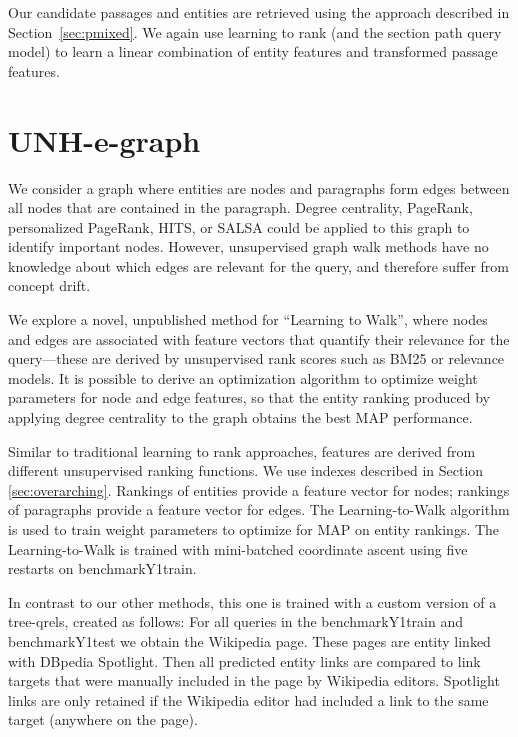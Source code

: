\documentclass{article}
\begin{document}
Our candidate passages and entities are retrieved using the approach described in Section~\ref{sec:pmixed}. We again use learning to rank (and the section path query model) to learn a linear combination of entity features and transformed passage features.



\section{UNH-e-graph}

We consider a graph where entities are nodes and paragraphs form edges between all nodes that are contained in the paragraph. Degree centrality, PageRank, personalized PageRank, HITS, or SALSA could be applied to this graph to identify important nodes. However, unsupervised graph walk methods have no knowledge about which edges are relevant for the query, and therefore suffer from concept drift. 

We explore a novel, unpublished method for ``Learning to Walk'', where nodes and edges are associated with feature vectors that quantify their relevance for the query---these are derived by unsupervised rank scores such as BM25 or relevance models. It is possible to derive an optimization algorithm to optimize weight parameters for node and edge features, so that the entity ranking produced by applying degree centrality to the graph obtains the best MAP performance.

Similar to traditional learning to rank approaches, features are derived from different unsupervised ranking functions. 
We use indexes described in Section \ref{sec:overarching}. Rankings of entities provide a feature vector for nodes; rankings of paragraphs provide a feature vector for edges.  The Learning-to-Walk algorithm is used to train weight parameters to optimize for MAP on entity rankings. The Learning-to-Walk is trained with mini-batched coordinate ascent using five restarts on benchmarkY1train.

In contrast to our other methods, this one is trained with a custom version of a tree-qrels, created as follows: For all queries in the benchmarkY1train and benchmarkY1test we obtain the Wikipedia page. These pages are entity linked with DBpedia Spotlight. Then all predicted entity links are compared to link targets that were manually included in the page by Wikipedia editors. Spotlight links are only retained if the Wikipedia editor had included a link to the same target (anywhere on the page). 
\end{document}
